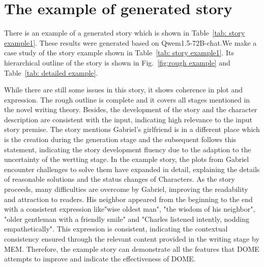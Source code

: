 \section{The example of generated story}
\label{sup:story example}
There is an example of a generated story which is shown in Table~\ref{tab: story example1}. These results were generated based on Qwem1.5-72B-chat.We make a case study of the story example shown in Table~\ref{tab: story example1}.
Its hierarchical outline of the story is shown in Fig.~\ref{fig:rough example} and Table~\ref{tab: detailed example}.\par
While there are still some issues in this story, it shows coherence in plot and expression. The rough outline is complete and it covers all stages mentioned in the novel writing theory. 
Besides, the development of the story and the character description are consistent with the input, indicating high relevance to the input story premise.
The story mentions Gabriel's girlfriend is in a different place which is the creation during the generation stage and the subsequent follows this statement, indicating the story development fluency due to the adaption to the uncertainty of the wertting stage.
In the example story, the plots from Gabriel encounter challenges to solve them have
expanded in detail, explaining the details of reasonable solutions and the status changes of Characters. As the story proceeds, many difficulties are overcome by Gabriel, improving the readability and attraction to readers. 
His neighbor appeared from the beginning to the end with a consistent expression like"wise oldest man", "the wisdom of his neighbor", "older gentleman with a friendly smile" and "Charles listened intently, nodding empathetically". This expression is consistent, indicating the contextual consistency ensured through the relevant content provided in the writing stage by MEM. 
Therefore, the example story can demonstrate all the features that DOME attempts to improve and indicate the effectiveness of DOME.

